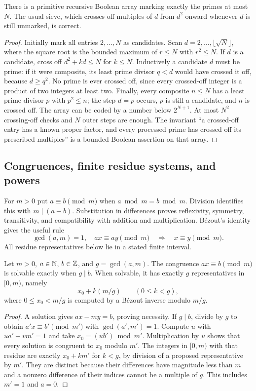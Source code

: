 \begin{theorem}
\label{el:sieve}
There is a primitive recursive Boolean array marking exactly the primes
at most $N$.  The usual sieve, which crosses off multiples of $d$ from
$d^2$ onward whenever $d$ is still unmarked, is correct.
\end{theorem}
\begin{proof}
Initially mark all entries $2,\ldots,N$ as candidates.  Scan
$d=2,\ldots,\lfloor\sqrt N\rfloor$, where the square root is the bounded
maximum of $r\le N$ with $r^2\le N$.  If $d$ is a candidate, cross off
$d^2+kd\le N$ for $k\le N$.
Inductively a candidate $d$ must be prime: if it were composite, its
least prime divisor $q<d$ would have crossed it off, because $d\ge q^2$.
No prime is ever crossed off, since every crossed-off integer is a
product of two integers at least two.  Finally, every composite $n\le N$
has a least prime divisor $p$ with $p^2\le n$; the step $d=p$ occurs,
$p$ is still a candidate, and $n$ is crossed off.  The array can be coded
by a number below $2^{N+1}$.  At most $N^2$ crossing-off checks and $N$
outer steps are enough.  The invariant ``a crossed-off entry has a known
proper factor, and every processed prime has crossed off its prescribed
multiples'' is a bounded Boolean assertion on that array.
\end{proof}

\subsection{Congruences, finite residue systems, and powers}

For $m>0$ put $a\equiv b\pmod m$ when $a\bmod m=b\bmod m$.
Division identifies this with $m\mid(a-b)$.  Substitution in differences
proves reflexivity, symmetry, transitivity, and compatibility with
addition and multiplication.  B\'ezout's identity gives the useful rule
\[
 \gcd(a,m)=1,\quad ax\equiv ay\pmod m
       \quad\Longrightarrow\quad x\equiv y\pmod m.
\]
All residue representatives below lie in a stated finite interval.

\begin{theorem}
\label{el:linearcong}
Let $m>0$, $a\in\mathbb N$, $b\in\mathbb Z$, and $g=\gcd(a,m)$.
The congruence $ax\equiv b\pmod m$ is solvable exactly when $g\mid b$.
When solvable, it has exactly $g$ representatives in $[0,m)$, namely
\[
 x_0+k(m/g)\qquad(0\le k<g),
\]
where $0\le x_0<m/g$ is computed by a B\'ezout inverse modulo $m/g$.
\end{theorem}
\begin{proof}
A solution gives $ax-my=b$, proving necessity.  If $g\mid b$, divide
by $g$ to obtain $a'x\equiv b'\pmod {m'}$ with
$\gcd(a',m')=1$.  Compute $u$ with $ua'+vm'=1$ and take
$x_0=(ub')\bmod m'$.  Multiplication by $u$ shows that every solution
is congruent to $x_0$ modulo $m'$.  The integers in $[0,m)$ with that
residue are exactly $x_0+km'$ for $k<g$, by division of a proposed
representative by $m'$.  They are distinct because their differences
have magnitude less than $m$ and a nonzero difference of their indices
cannot be a multiple of $g$.  This includes $m'=1$ and $a=0$.
\end{proof}

